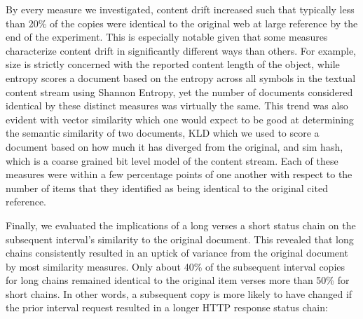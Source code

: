 \documentclass[12pt]{article}
\begin{document}
By every measure we investigated, content drift increased such that typically less than 20\% of the copies were identical to the original web at large reference by the end of the experiment. This is especially notable given that some measures characterize content drift in significantly different ways than others. For example, size is strictly concerned with the reported content length of the object, while entropy scores a document based on the entropy across all symbols in the textual content stream using Shannon Entropy, yet the number of documents considered identical by these distinct measures was virtually the same. This trend was also evident with vector similarity which one would expect to be good at determining the semantic similarity of two documents, KLD which we used to score a document based on how much it has diverged from the original, and sim hash, which is a coarse grained bit level model of the content stream. Each of these measures were within a few percentage points of one another with respect to the number of items that they identified as being identical to the original cited reference. 

Finally, we evaluated the implications of a long verses a short status chain on the subsequent interval's similarity to the original document. This revealed that long chains consistently resulted in an uptick of variance from the original document by most similarity measures. Only about 40\% of the subsequent interval copies for long chains remained identical to the original item verses more than 50\% for short chains. In other words, a subsequent copy is more likely to have changed if the prior interval request resulted in a longer HTTP response status chain:
\end{document}
